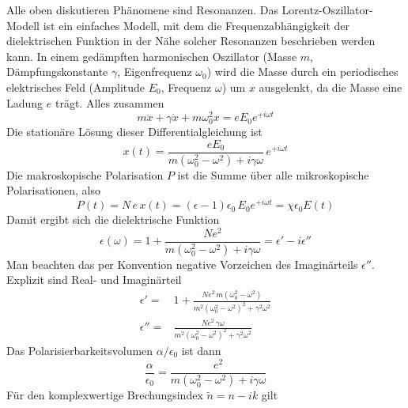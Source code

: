 Alle oben diskutieren Phänomene sind Resonanzen. Das Lorentz-Oszillator-Modell ist ein einfaches Modell, mit dem die Frequenzabhängigkeit der dielektrischen Funktion in der Nähe solcher Resonanzen beschrieben werden kann. In einem gedämpften harmonischen Oszillator (Masse $m$, Dämpfungskonstante $\gamma$, Eigenfrequenz $\omega_0$) wird die Masse durch ein periodisches elektrisches Feld (Amplitude $E_0$, Frequenz $\omega$) um $x$ ausgelenkt, da die Masse eine Ladung $e$ trägt. Alles zusammen
\begin{equation}
 m \ddot{x} + \gamma \dot{x} + m \omega_0^2  x = e E_0 e^{+ i \omega t}
\end{equation}
Die stationäre Lösung dieser Differentialgleichung ist
\begin{equation}
 x(t) = \frac{e E_0}{m (\omega_0^2  - \omega^2) + i \gamma \omega} \, e^{+ i \omega t}
\end{equation}
Die makroskopische Polarisation $P$ ist die Summe über alle mikroskopische Polarisationen, also
\begin{equation}
P(t) = N \, e \,x(t) =  (\epsilon -1 ) \epsilon_0 \, E_0 e^{+ i \omega t}
= \chi \epsilon_0 E(t)
\end{equation}
Damit ergibt sich die dielektrische Funktion
\begin{equation}
\epsilon(\omega) = 1 + \frac{N e^2}{m (\omega_0^2  - \omega^2) + i \gamma \omega} = \epsilon' - i \epsilon''
\end{equation}
Man beachten das per Konvention negative Vorzeichen des Imaginärteils $\epsilon''$. Explizit sind Real- und Imaginärteil
\begin{align}
 \epsilon' = & 1 + \frac{N e^2 \, m (\omega_0^2  - \omega^2)}{m^2 (\omega_0^2  - \omega^2)^2 +  \gamma^2 \omega^2}  \\
  \epsilon'' = &  \frac{N e^2 \, \gamma \omega }{m^2 (\omega_0^2  - \omega^2)^2 +  \gamma^2 \omega^2} 
\end{align}
Das Polarisierbarkeitsvolumen $\alpha / \epsilon_0$ ist dann
\begin{equation}
\frac{\alpha}{\epsilon_0} = \frac{e^2}{m (\omega_0^2  - \omega^2) + i \gamma \omega} 
\end{equation}
Für den  komplexwertige Brechungsindex $\tilde{n} = n - i k$ gilt

